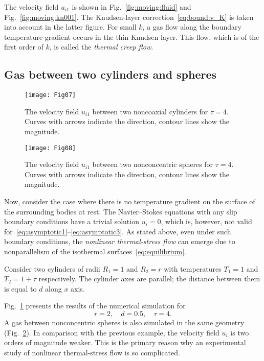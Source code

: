 \documentclass[smallextended]{svjour3} %
\begin{document}
The velocity field \(u_{i1}\) is shown in Fig.~\ref{fig:moving:fluid} and Fig.~\ref{fig:moving:kn001}.
The Knudsen-layer correction~\eqref{eq:bound:v_K} is taken into account in the latter figure.
For small \(k\), a gas flow along the boundary temperature gradient occurs
in the thin Knudsen layer. This flow, which is of the first order of \(k\), is called
the \emph{thermal creep flow}.

\subsection{Gas between two cylinders and spheres}

\begin{figure}
    \centering
    \texttt{[image: Fig07]}
    \caption{The velocity field \(u_{i1}\) between two noncoaxial cylinders for \(\tau=4\).
        Curves with arrows indicate the direction, contour lines show the magnitude.}
    \label{fig:cylinders}
\end{figure}

\begin{figure}
    \centering
    \texttt{[image: Fig08]}
    \caption{The velocity field \(u_{i1}\) between two nonconcentric spheres for \(\tau=4\).
        Curves with arrows indicate the direction, contour lines show the magnitude.}
    \label{fig:spheres}
\end{figure}

Now, consider the case where there is no temperature gradient on the surface of the surrounding bodies at rest.
The Navier--Stokes equations with any slip boundary conditions have a trivial solution \(u_i = 0\),
which is, however, not valid for~\eqref{eq:asymptotic1}--\eqref{eq:asymptotic3}.
As stated above, even under such boundary conditions, the \emph{nonlinear thermal-stress flow}
can emerge due to nonparallelism of the isothermal surfaces~\eqref{eq:equilibrium}.

Consider two cylinders of radii \(R_1 = 1\) and \(R_2 = r\)
with temperatures \(T_1 = 1\) and \(T_2 = 1+\tau\) respectively.
The cylinder axes are parallel; the distance between them is equal to \(d\) along \(x\) axis.

Fig.~\ref{fig:cylinders} presents the results of the numerical simulation for
\[ r = 2, \quad d = 0.5, \quad \tau = 4. \]
A gas between nonconcentric spheres is also simulated in the same geometry (Fig.~\ref{fig:spheres}).
In comparison with the previous example, the velocity field \(u_i\) is two orders of magnitude weaker.
This is the primary reason why an experimental study of nonlinear thermal-stress flow is so complicated.
\end{document}
